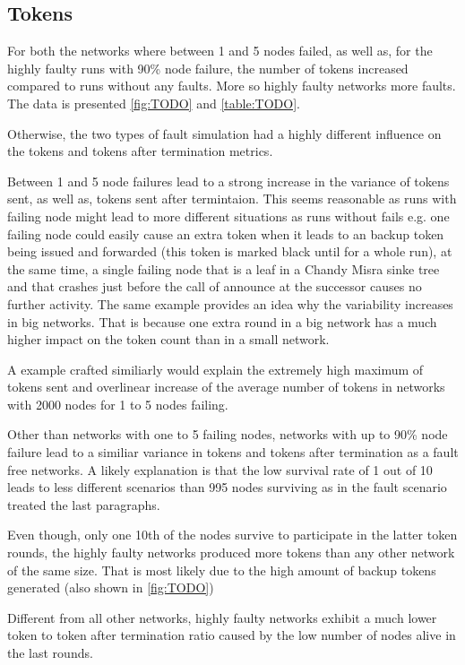 \subsection{Tokens}
For both the networks where between 1 and 5 nodes failed, as well as, for the highly faulty runs with 90\% node failure, the number of tokens increased compared to runs without any faults.
More so highly faulty networks more faults. The data is presented \cref{fig:TODO} and \cref{table:TODO}. %

Otherwise, the two types of fault simulation had a highly different influence on the tokens and tokens after termination metrics.

Between 1 and 5 node failures lead to a strong increase in the variance of tokens sent, as well as, tokens sent after termintaion.
This seems reasonable as runs with failing node might lead to more different situations as runs without fails e.g. one failing node could easily cause an extra token when it leads to an backup token being issued and forwarded (this token is marked black until for a whole run), at the same time, a single failing node that is a leaf in a Chandy Misra sinke tree and that crashes just before the call of announce at the successor  causes no further activity.
The same example provides an idea why the variability increases in big networks. 
That is because one extra round in a big network has a much higher impact on the token count than in a small network.

A example crafted similiarly would explain the extremely high maximum of tokens sent and overlinear increase of the average number of tokens in networks with 2000 nodes for 1 to 5 nodes failing.

Other than networks with one to 5 failing nodes, networks with up to 90\% node failure lead to a similiar variance in tokens and tokens after termination as a fault free networks.
A likely explanation is that the low survival rate of 1 out of 10 leads to less different scenarios than 995 nodes surviving as in the fault scenario treated the last paragraphs.

Even though, only one 10th of the nodes survive to participate in the latter token rounds, the highly faulty networks produced more tokens than any other network of the same size.
That is most likely due to the high amount of backup tokens generated (also shown in \cref{fig:TODO})

Different from all other networks, highly faulty networks exhibit a much lower token to token after termination ratio caused by the low number of nodes alive in the last rounds.
    
